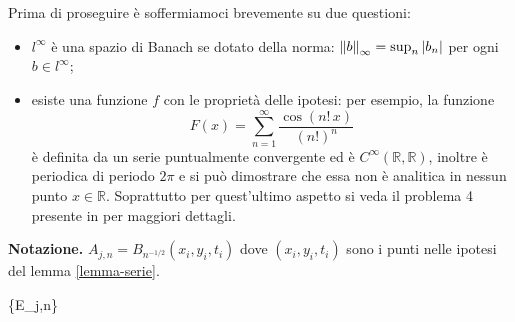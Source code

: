 \begin{remark}
Prima di proseguire è soffermiamoci brevemente su due questioni:
\begin{itemize}
\item
$l^{\infty}$ è una spazio di Banach se dotato della norma: $\left\lVert b\right\rVert_\infty=\sup_n|b_n|$ per ogni $b \in l^{\infty}$;
\item
esiste una funzione $f$ con le proprietà delle ipotesi: per esempio, la funzione $$F(x)=\sum_{n=1}^\infty\frac{\cos(n!\,x)}{(n!)^n}$$ è definita da un serie puntualmente convergente ed è $C^{\infty}(\mathbb{R},\mathbb{R})$, inoltre è periodica di periodo $2\pi$ e si può dimostrare che essa non è analitica in nessun punto $x\in\mathbb{R}$. Soprattutto per quest'ultimo aspetto si veda il problema 4 presente in \cite[cap.3]{John} per maggiori dettagli.
\end{itemize}
\end{remark}
\textbf{Notazione.} $A_{j,n} = B_{n^{-1/2}}(x_i,y_i,t_i)$ dove $(x_i,y_i,t_i)$ sono i punti nelle ipotesi del lemma \ref{lemma-serie}.
\begin{lemma}\label{lemma-e}
{\{E_{j,n}\} }
\end{lemma}

